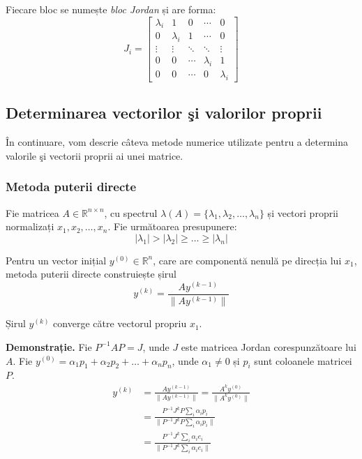\documentclass{exam}
\begin{document}
Fiecare bloc se numește \textit{bloc Jordan} și are forma:
\begin{equation*}
	J_i = \begin{bmatrix}
		\lambda_i & 1         & 0      & \cdots    & 0         \\
		0         & \lambda_i & 1      & \cdots    & 0         \\
		\vdots    & \vdots    & \ddots & \ddots    & \vdots    \\
		0         & 0         & \cdots & \lambda_i & 1         \\
		0         & 0         & \cdots & 0         & \lambda_i
	\end{bmatrix}
\end{equation*}

\subsection{Determinarea vectorilor şi valorilor proprii}

În continuare, vom descrie câteva metode numerice utilizate pentru a determina
valorile şi vectorii proprii ai unei matrice.

\subsubsection{Metoda puterii directe}

Fie matricea $A \in \mathbb{R}^{n\times n}$, cu spectrul
$\lambda(A) = \{\lambda_1, \lambda_2, \dots, \lambda_n\}$ și vectori proprii
normalizați $x_1, x_2, \dots, x_n$. Fie următoarea presupunere:
\begin{equation*}
	|\lambda_1| > |\lambda_2| \geq \dots \geq |\lambda_n|
\end{equation*}

Pentru un vector inițial $y^{(0)} \in \mathbb{R}^{n}$, care are componentă
nenulă pe direcția lui $x_1$, metoda puterii directe construiește șirul
\begin{equation*}
	y^{(k)} = \frac{A y^{(k-1)}}{\|A y^{(k-1)}\|}
\end{equation*}

Șirul $y^{(k)}$ converge către vectorul propriu $x_1$.

\textbf{Demonstrație.} Fie $P^{-1} A P = J$, unde $J$ este matricea Jordan
corespunzătoare lui $A$. Fie $y^{(0)} = \alpha_1 p_1 + \alpha_2 p_2 + \dots + \alpha_n p_n$, unde
$\alpha_1 \neq 0$ și $p_i$ sunt coloanele matricei $P$.
\begin{align*}
	y^{(k)} & = \frac{A y^{(k-1)}}{\|A y^{(k-1)}\|} = \frac{A^k y^{(0)}}{\|A^k y^{(0)}\|}      \\
	        & = \frac{P^{-1} J^k P \sum_i \alpha_i p_i }{\|P^{-1} J^k P \sum_i \alpha_i p_i\|} \\
	        & = \frac{P^{-1} J^k \sum_i \alpha_i e_i}{\|P^{-1} J^k \sum_i \alpha_i e_i\|}      \\
\end{align*}
\end{document}
